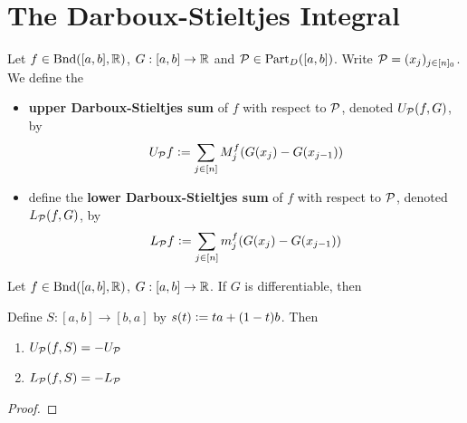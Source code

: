 \documentclass{book}
\begin{document}
	
	
	
	
	
	
	
	
	
	
	
	
	
	
	
	
	
	
	
	
	
	\newpage
	\section{The Darboux-Stieltjes Integral}
	
	
	\begin{defn}
		Let $f \in \text{Bnd}([a,b], \mathbb{R})$, $G:[a,b] \rightarrow \mathbb{R}$ and $\mathcal{P} \in \text{Part}_D([a,b])$. Write $\mathcal{P} = (x_j)_{j \in [n]_0}$. We define the 
		\begin{itemize}
			\item \textbf{upper Darboux-Stieltjes sum} of $f$ with respect to $\mathcal{P}$, denoted $U_{\mathcal{P}} (f,G)$, by 
			$$U_{\mathcal{P}} f \vcentcolon= \sum\limits_{j \in [n]} M^f_j (G(x_j) - G(x_{j-1}))$$ 
			\item define the \textbf{lower Darboux-Stieltjes sum} of $f$ with respect to $\mathcal{P}$, denoted $L_{\mathcal{P}} (f,G)$, by
			$$L_{\mathcal{P}} f \vcentcolon= \sum\limits_{j \in [n]} m^f_j (G(x_j) - G(x_{j-1}))$$ 
		\end{itemize}
	\end{defn}
	
	\begin{ex}
		Let $f \in \text{Bnd}([a,b], \mathbb{R})$, $G:[a,b] \rightarrow \mathbb{R}$. If $G$ is differentiable, then 
	\end{ex}
	
	
	
	
	
	\begin{ex}
		Define $S:[a,b] \rightarrow [b,a]$ by $s(t) \vcentcolon= ta + (1-t) b$. Then 
		\begin{enumerate}
			\item $U_{\mathcal{P}}(f,S) = - U_{\mathcal{P}}$
			\item $L_{\mathcal{P}}(f,S) = - L_{\mathcal{P}}$
		\end{enumerate}
	\end{ex}
	
	\begin{proof}
		
	\end{proof}
	
\end{document}
